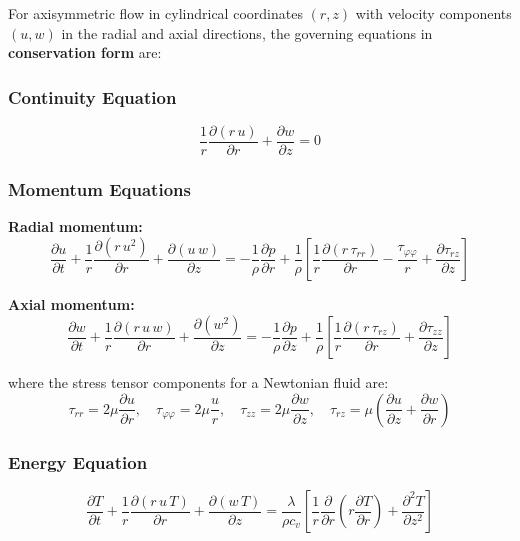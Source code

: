 \documentclass[12pt,a4paper]{article}
\newcommand{\parder}[2]{\frac{\partial #1}{\partial #2}}
\newcommand{\pparder}[2]{\frac{\partial^2 #1}{\partial {#2}^2}}
\begin{document}
For axisymmetric flow in cylindrical coordinates $(r, z)$ with velocity components $(u, w)$ in the radial and axial directions, the governing equations in \textbf{conservation form} are:

\subsubsection{Continuity Equation}

\begin{equation}
    \frac{1}{r}\parder{(r\,u)}{r} + \parder{w}{z} = 0
    \label{eq:continuity_dim}
\end{equation}

\subsubsection{Momentum Equations}

\textbf{Radial momentum:}
\begin{equation}
    \parder{u}{t} + \frac{1}{r}\parder{(r\,u^2)}{r} + \parder{(u\,w)}{z}
    = -\frac{1}{\rho}\parder{p}{r}
      + \frac{1}{\rho}\left[\frac{1}{r}\parder{(r\,\tau_{rr})}{r} - \frac{\tau_{\varphi\varphi}}{r} + \parder{\tau_{rz}}{z}\right]
    \label{eq:momentum_r_dim}
\end{equation}

\textbf{Axial momentum:}
\begin{equation}
    \parder{w}{t} + \frac{1}{r}\parder{(r\,u\,w)}{r} + \parder{(w^2)}{z}
    = -\frac{1}{\rho}\parder{p}{z}
      + \frac{1}{\rho}\left[\frac{1}{r}\parder{(r\,\tau_{rz})}{r} + \parder{\tau_{zz}}{z}\right]
    \label{eq:momentum_z_dim}
\end{equation}

where the stress tensor components for a Newtonian fluid are:
\begin{equation}
    \tau_{rr} = 2\mu\parder{u}{r}, \quad
    \tau_{\varphi\varphi} = 2\mu\frac{u}{r}, \quad
    \tau_{zz} = 2\mu\parder{w}{z}, \quad
    \tau_{rz} = \mu\left(\parder{u}{z} + \parder{w}{r}\right)
\end{equation}

\subsubsection{Energy Equation}

\begin{equation}
    \parder{T}{t} + \frac{1}{r}\parder{(r\,u\,T)}{r} + \parder{(w\,T)}{z}
    = \frac{\lambda}{\rho c_v}\left[\frac{1}{r}\parder{}{r}\!\left(r\parder{T}{r}\right) + \pparder{T}{z}\right]
    \label{eq:energy_dim}
\end{equation}
\end{document}
